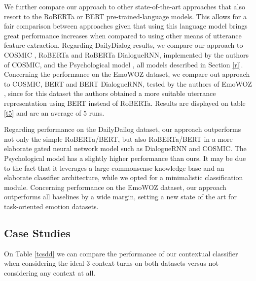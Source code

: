 \documentclass[11pt]{article}
\begin{document}
We further compare our approach to other state-of-the-art approaches that also resort to the RoBERTa or BERT pre-trained-language models. This allows for a fair comparison between approaches given that using this language model brings great performance increases when compared to using other means of utterance feature extraction. Regarding DailyDialog results, we compare our approach to COSMIC \cite{ghosal-etal-2020-cosmic}, RoBERTa and RoBERTa DialogueRNN, implemented by the authors of COSMIC, and the Psychological model \cite{li-etal-2021-past-present}, all models described in Section \ref{rl}. Concerning the performance on the EmoWOZ dataset, we compare out approach to COSMIC, BERT and BERT DialogueRNN, tested by the authors of EmoWOZ \cite{feng2022emowoz}, since for this dataset the authors obtained a more suitable uterrance representation using BERT instead of RoBERTa. Results are displayed on table \ref{t5} and are an average of 5 runs.


Regarding performance on the DailyDailog dataset, our approach outperforms not only the simple RoBERTa/BERT, but also RoBERTa/BERT in a more elaborate gated neural network model such as DialogueRNN and COSMIC. The Psychological model has a slightly higher performance than ours. It may be due to the fact that it leverages a large commonsense knowledge base and an elaborate classifier architecture, while we opted for a minimalistic classification module.
Concerning performance on the EmoWOZ dataset, our approach outperforms all baselines by a wide margin, setting a new state of the art for task-oriented emotion datasets.

\subsection{Case Studies}

On Table \ref{tcsdd} we can compare the performance of our contextual classifier when considering the ideal 3 context turns on both datasets versus not considering any context at all. 
\end{document}

